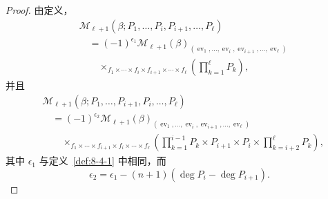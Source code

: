 \begin{proof}
由定义，
\begin{equation}
\begin{aligned}
 &\mathcal M_{\ell+1}
  (\beta;P_1,\ldots,P_i,P_{i+1},\ldots,P_\ell)\\
 &\quad={}
 (-1)^{\epsilon_1}
 \mathcal M_{\ell+1}(\beta)_{
 (\operatorname{ev}_1,\ldots,
  \operatorname{ev}_i,\operatorname{ev}_{i+1},\ldots,
  \operatorname{ev}_\ell)}\\[-2pt]
 &\qquad{}\mathop{\times}_{
 f_1\times\cdots\times f_i\times f_{i+1}\times\cdots\times f_\ell}
 \left(\prod_{k=1}^{\ell}P_k\right),
\end{aligned}
\tag{8.4.4.1}\label{eq:8-4-4-1}
\end{equation}
并且
\begin{equation}
\begin{aligned}
 &\mathcal M_{\ell+1}
  (\beta;P_1,\ldots,P_{i+1},P_i,\ldots,P_\ell)\\
 &\quad={}
 (-1)^{\epsilon_2}
 \mathcal M_{\ell+1}(\beta)_{
 (\operatorname{ev}_1,\ldots,
  \operatorname{ev}_i,\operatorname{ev}_{i+1},\ldots,
  \operatorname{ev}_\ell)}\\[-2pt]
 &\qquad{}\mathop{\times}_{
 f_1\times\cdots\times f_{i+1}\times f_i\times\cdots\times f_\ell}
 \left(
  \prod_{k=1}^{i-1}P_k\times P_{i+1}\times P_i
  \times\prod_{k=i+2}^{\ell}P_k
 \right),
\end{aligned}
\tag{8.4.4.2}\label{eq:8-4-4-2}
\end{equation}
其中 $\epsilon_1$ 与定义~\ref{def:8-4-1} 中相同，而
\[
 \epsilon_2
 =\epsilon_1-(n+1)(\deg P_i-\deg P_{i+1}).
\]


\end{proof}
